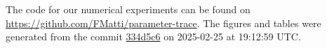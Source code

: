 The code for our numerical experiments can be found on \url{https://github.com/FMatti/parameter-trace}. The figures and tables were generated from the commit \href{https://github.com/FMatti/parameter-trace/tree/334d5c6}{334d5c6} on 2025-02-25 at 19:12:59 UTC.

